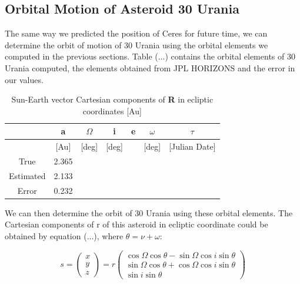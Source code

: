 \documentclass[letterpaper,12pt]{article}
\begin{document}
\subsection{Orbital Motion of Asteroid 30 Urania}
The same way we predicted the position of Ceres for future time, we can determine the orbit of motion of 30 Urania using the orbital elements we computed in the previous sections. Table (...) contains the orbital elements of 30 Urania computed, the elements obtained from JPL HORIZONS and the error in our values.


\FloatBarrier
\begin{table}[h!]
\caption{Sun-Earth vector Cartesian components of {\bf R} in ecliptic coordinates [Au]} %
\centering %
\begin{tabular}{| c | c | c | c | c | c | c |} %
\hline\hline %
 & a & \begin{math} \Omega \end{math}  & i & e & \begin{math} \omega \end{math}  & \begin{math} \tau \end{math} \\ [0.5ex] %
\hline %
  & [Au]  &  [deg] &[deg] & & [deg] & [Julian Date] \\ \hline 
True & 2.365 &   &    &  &  & \\ \hline
Estimated & 2.133 &   &  &   & & \\  \hline
Error & 0.232 &   &     &    & & \\[1ex] %
\hline %
\end{tabular}
\label{table:nonlin} %
\end{table}
\FloatBarrier

We can then determine the orbit of 30 Urania using these orbital elements. The Cartesian components of r of this asteroid in ecliptic coordinate could be obtained by equation (...), where \begin{math} \theta = \nu + \omega \end{math}:

\begin{equation}
s=
\begin{pmatrix}
  x \\
  y \\
  z
 \end{pmatrix} 
  =r
\begin{pmatrix}
\cos \Omega \cos \theta - \sin \Omega \cos i \sin \theta \\ 
 \sin \Omega \cos \theta+ \cos \Omega \cos i \sin \theta \\ 
 \sin i \sin \theta
\end{pmatrix}
\end{equation}
\end{document}
